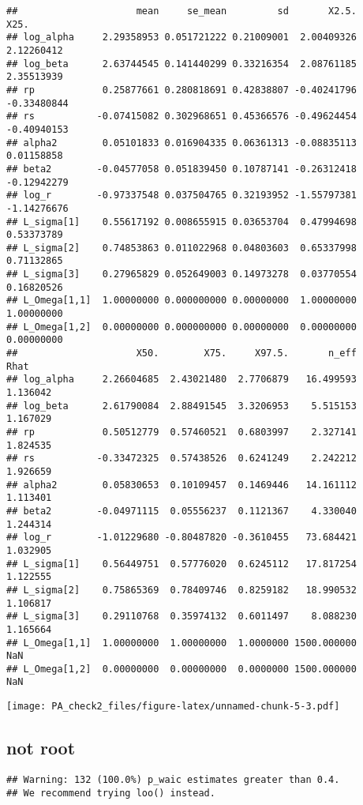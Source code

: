 \documentclass[12pt,]{article}
\begin{document}
\begin{verbatim}
##                     mean     se_mean         sd       X2.5.        X25.
## log_alpha     2.29358953 0.051721222 0.21009001  2.00409326  2.12260412
## log_beta      2.63744545 0.141440299 0.33216354  2.08761185  2.35513939
## rp            0.25877661 0.280818691 0.42838807 -0.40241796 -0.33480844
## rs           -0.07415082 0.302968651 0.45366576 -0.49624454 -0.40940153
## alpha2        0.05101833 0.016904335 0.06361313 -0.08835113  0.01158858
## beta2        -0.04577058 0.051839450 0.10787141 -0.26312418 -0.12942279
## log_r        -0.97337548 0.037504765 0.32193952 -1.55797381 -1.14276676
## L_sigma[1]    0.55617192 0.008655915 0.03653704  0.47994698  0.53373789
## L_sigma[2]    0.74853863 0.011022968 0.04803603  0.65337998  0.71132865
## L_sigma[3]    0.27965829 0.052649003 0.14973278  0.03770554  0.16820526
## L_Omega[1,1]  1.00000000 0.000000000 0.00000000  1.00000000  1.00000000
## L_Omega[1,2]  0.00000000 0.000000000 0.00000000  0.00000000  0.00000000
##                     X50.        X75.     X97.5.       n_eff     Rhat
## log_alpha     2.26604685  2.43021480  2.7706879   16.499593 1.136042
## log_beta      2.61790084  2.88491545  3.3206953    5.515153 1.167029
## rp            0.50512779  0.57460521  0.6803997    2.327141 1.824535
## rs           -0.33472325  0.57438526  0.6241249    2.242212 1.926659
## alpha2        0.05830653  0.10109457  0.1469446   14.161112 1.113401
## beta2        -0.04971115  0.05556237  0.1121367    4.330040 1.244314
## log_r        -1.01229680 -0.80487820 -0.3610455   73.684421 1.032905
## L_sigma[1]    0.56449751  0.57776020  0.6245112   17.817254 1.122555
## L_sigma[2]    0.75865369  0.78409746  0.8259182   18.990532 1.106817
## L_sigma[3]    0.29110768  0.35974132  0.6011497    8.088230 1.165664
## L_Omega[1,1]  1.00000000  1.00000000  1.0000000 1500.000000      NaN
## L_Omega[1,2]  0.00000000  0.00000000  0.0000000 1500.000000      NaN
\end{verbatim}

\texttt{[image: PA\_check2\_files/figure-latex/unnamed-chunk-5-3.pdf]}

\subsection{not root}\label{not-root}

\begin{verbatim}
## Warning: 132 (100.0%) p_waic estimates greater than 0.4.
## We recommend trying loo() instead.
\end{verbatim}
\end{document}

